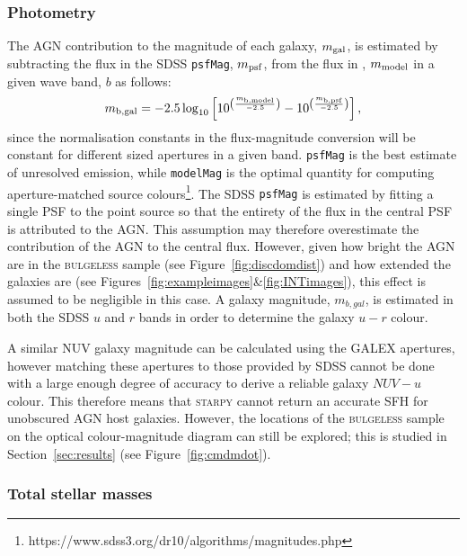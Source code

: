 {\subsubsection{Photometry}\label{sec:photo}

The AGN contribution to the magnitude of each galaxy, $m_{\rm{gal}}$, is estimated by subtracting the flux in the SDSS {\tt psfMag}, $m_{\rm{psf}}$, from the flux in {}, $m_{\rm{model}}$ in a given wave band, $b$ as follows:
\begin{equation}\label{galmag}
m_{\rm{b, gal}} = -2.5 \log_{10} \left[ 10^{\left(\frac{m_{\rm{b, model}}}{-2.5}\right)} - 10^{\left(\frac{m_{\rm{b, psf}}}{-2.5}\right)} \right],
\end{equation}
since the normalisation constants in the flux-magnitude conversion will be constant for different sized apertures in a given band. {\tt psfMag} is the best estimate of unresolved emission, while {\tt modelMag} is the optimal quantity for computing aperture-matched source colours\footnote{https://www.sdss3.org/dr10/algorithms/magnitudes.php}. The SDSS {\tt psfMag} is estimated by fitting a single PSF to the point source so that the entirety of the flux in the central PSF is attributed to the AGN. This assumption may therefore overestimate the contribution of the AGN to the central flux. However, given how bright the AGN are in the \textsc{bulgeless} sample (see Figure~\ref{fig:discdomdist}) and how extended the galaxies are (see Figures~\ref{fig:exampleimages}\&\ref{fig:INTimages}), this effect is assumed to be negligible in this case. A galaxy magnitude, $m_{b, gal}$, is estimated in both the SDSS $u$ and $r$ bands in order to determine the galaxy $u-r$ colour. 

A similar NUV galaxy magnitude can be calculated using the GALEX apertures, however matching these apertures to those provided by SDSS cannot be done with a large enough degree of accuracy to derive a reliable galaxy $NUV-u$ colour. This therefore means that \textsc{starpy} cannot return an accurate SFH for unobscured AGN host galaxies. However, the locations of the \textsc{bulgeless} sample on the optical colour-magnitude diagram can still be explored; this is studied in Section~\ref{sec:results} (see Figure~\ref{fig:cmdmdot}). 

\subsubsection{Total stellar masses}\label{sec:galmass}

}
